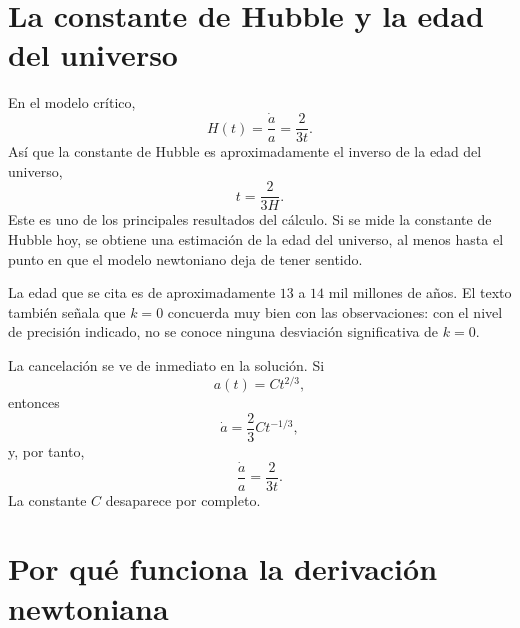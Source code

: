 \section{La constante de Hubble y la edad del universo}

En el modelo crítico,
\begin{equation}
H(t)=\frac{\dot a}{a}=\frac{2}{3t}.
\end{equation}
Así que la constante de Hubble es aproximadamente el inverso de la edad del universo,
\begin{equation}
t=\frac{2}{3H}.
\end{equation}
Este es uno de los principales resultados del cálculo. Si se mide la constante de Hubble hoy, se obtiene una estimación de la edad del universo, al menos hasta el punto en que el modelo newtoniano deja de tener sentido.

La edad que se cita es de aproximadamente \(13\) a \(14\) mil millones de años. El texto también señala que \(k=0\) concuerda muy bien con las observaciones: con el nivel de precisión indicado, no se conoce ninguna desviación significativa de \(k=0\).

\begin{classroomqa}
\end{classroomqa}

La cancelación se ve de inmediato en la solución. Si
\begin{equation}
a(t)=Ct^{2/3},
\end{equation}
entonces
\begin{equation}
\dot a=\frac{2}{3}Ct^{-1/3},
\end{equation}
y, por tanto,
\begin{equation}
\frac{\dot a}{a}=\frac{2}{3t}.
\end{equation}
La constante \(C\) desaparece por completo.

\section{Por qué funciona la derivación newtoniana}

